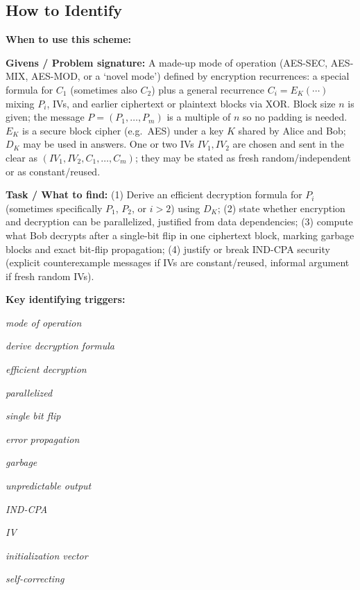 \documentclass[12pt, a4paper]{article}
\begin{document}
\subsection*{How to Identify}

\textbf{When to use this scheme:}

\textbf{Givens / Problem signature:}
A made-up mode of operation (AES-SEC, AES-MIX, AES-MOD, or a `novel mode') defined by encryption recurrences: a special formula for $C_1$ (sometimes also $C_2$) plus a general recurrence $C_i = E_K(\cdots)$ mixing $P_i$, IVs, and earlier ciphertext or plaintext blocks via XOR.
Block size $n$ is given; the message $P = (P_1, \dots, P_m)$ is a multiple of $n$ so no padding is needed. $E_K$ is a secure block cipher (e.g.\ AES) under a key $K$ shared by Alice and Bob; $D_K$ may be used in answers.
One or two IVs $IV_1, IV_2$ are chosen and sent in the clear as $(IV_1, IV_2, C_1, \dots, C_m)$; they may be stated as fresh random/independent or as constant/reused.

\textbf{Task / What to find:}
(1) Derive an efficient decryption formula for $P_i$ (sometimes specifically $P_1$, $P_2$, or $i > 2$) using $D_K$; (2) state whether encryption and decryption can be parallelized, justified from data dependencies; (3) compute what Bob decrypts after a single-bit flip in one ciphertext block, marking garbage blocks and exact bit-flip propagation; (4) justify or break IND-CPA security (explicit counterexample messages if IVs are constant/reused, informal argument if fresh random IVs).

\textbf{Key identifying triggers:}
\begin{tightitem}
        \item \textit{mode of operation}
        \item \textit{derive decryption formula}
        \item \textit{efficient decryption}
        \item \textit{parallelized}
        \item \textit{single bit flip}
        \item \textit{error propagation}
        \item \textit{garbage}
        \item \textit{unpredictable output}
        \item \textit{IND-CPA}
        \item \textit{IV}
        \item \textit{initialization vector}
        \item \textit{self-correcting}
    \end{tightitem}
\end{document}
